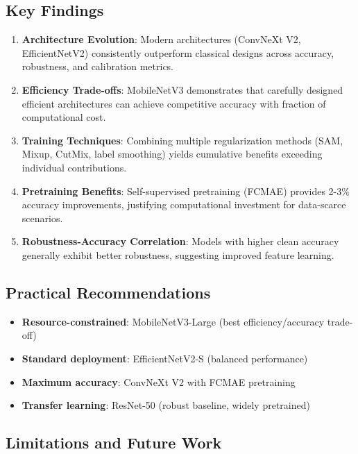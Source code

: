 \subsection{Key Findings}

\begin{enumerate}
    \item \textbf{Architecture Evolution}: Modern architectures (ConvNeXt V2, EfficientNetV2) consistently outperform classical designs across accuracy, robustness, and calibration metrics.
    
    \item \textbf{Efficiency Trade-offs}: MobileNetV3 demonstrates that carefully designed efficient architectures can achieve competitive accuracy with fraction of computational cost.
    
    \item \textbf{Training Techniques}: Combining multiple regularization methods (SAM, Mixup, CutMix, label smoothing) yields cumulative benefits exceeding individual contributions.
    
    \item \textbf{Pretraining Benefits}: Self-supervised pretraining (FCMAE) provides 2-3\% accuracy improvements, justifying computational investment for data-scarce scenarios.
    
    \item \textbf{Robustness-Accuracy Correlation}: Models with higher clean accuracy generally exhibit better robustness, suggesting improved feature learning.
\end{enumerate}

\subsection{Practical Recommendations}

\begin{itemize}
    \item \textbf{Resource-constrained}: MobileNetV3-Large (best efficiency/accuracy trade-off)
    \item \textbf{Standard deployment}: EfficientNetV2-S (balanced performance)
    \item \textbf{Maximum accuracy}: ConvNeXt V2 with FCMAE pretraining
    \item \textbf{Transfer learning}: ResNet-50 (robust baseline, widely pretrained)
\end{itemize}

\subsection{Limitations and Future Work}

